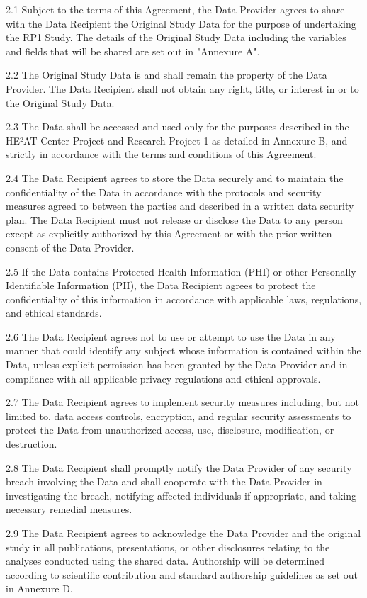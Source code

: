 \documentclass[12pt,letterpaper]{article}
\begin{document}
2.1 Subject to the terms of this Agreement, the Data Provider agrees to share with the Data Recipient the Original Study Data for the purpose of undertaking the RP1 Study. The details of the Original Study Data including the variables and fields that will be shared are set out in "Annexure A".

2.2 The Original Study Data is and shall remain the property of the Data Provider. The Data Recipient shall not obtain any right, title, or interest in or to the Original Study Data.

2.3 The Data shall be accessed and used only for the purposes described in the HE²AT Center Project and Research Project 1 as detailed in Annexure B, and strictly in accordance with the terms and conditions of this Agreement.

2.4 The Data Recipient agrees to store the Data securely and to maintain the confidentiality of the Data in accordance with the protocols and security measures agreed to between the parties and described in a written data security plan. The Data Recipient must not release or disclose the Data to any person except as explicitly authorized by this Agreement or with the prior written consent of the Data Provider.

2.5 If the Data contains Protected Health Information (PHI) or other Personally Identifiable Information (PII), the Data Recipient agrees to protect the confidentiality of this information in accordance with applicable laws, regulations, and ethical standards.

2.6 The Data Recipient agrees not to use or attempt to use the Data in any manner that could identify any subject whose information is contained within the Data, unless explicit permission has been granted by the Data Provider and in compliance with all applicable privacy regulations and ethical approvals.

2.7 The Data Recipient agrees to implement security measures including, but not limited to, data access controls, encryption, and regular security assessments to protect the Data from unauthorized access, use, disclosure, modification, or destruction.

2.8 The Data Recipient shall promptly notify the Data Provider of any security breach involving the Data and shall cooperate with the Data Provider in investigating the breach, notifying affected individuals if appropriate, and taking necessary remedial measures.

2.9 The Data Recipient agrees to acknowledge the Data Provider and the original study in all publications, presentations, or other disclosures relating to the analyses conducted using the shared data. Authorship will be determined according to scientific contribution and standard authorship guidelines as set out in Annexure D.
\end{document}
